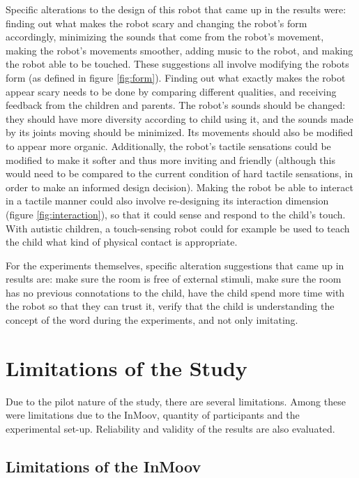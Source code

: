 Specific alterations to the design of this robot that came up in the results were: finding out what makes the robot scary and changing the robot's form accordingly, minimizing the sounds that come from the robot's movement, making the robot's movements smoother, adding music to the robot, and making the robot able to be touched. These suggestions all involve modifying the robots form (as defined in figure \ref{fig:form}). Finding out what exactly makes the robot appear scary needs to be done by comparing different qualities, and receiving feedback from the children and parents. The robot's sounds should be changed: they should have more diversity according to child using it, and the sounds made by its joints moving should be minimized. Its movements should also be modified to appear more organic. Additionally, the robot's tactile sensations could be modified to make it softer and thus more inviting and friendly (although this would need to be compared to the current condition of hard tactile sensations, in order to make an informed design decision). Making the robot be able to interact in a tactile manner could also involve re-designing its interaction dimension (figure \ref{fig:interaction}), so that it could sense and respond to the child's touch. With autistic children, a touch-sensing robot could for example be used to teach the child what kind of physical contact is appropriate.

For the experiments themselves, specific alteration suggestions that came up in results are: make sure the room is free of external stimuli, make sure the room has no previous connotations to the child, have the child spend more time with the robot so that they can trust it, verify that the child is understanding the concept of the word during the experiments, and not only imitating.



\section{Limitations of the Study}

Due to the pilot nature of the study, there are several limitations. Among these were limitations due to the InMoov, quantity of participants and the experimental set-up. Reliability and validity of the results are also evaluated.


\subsection{Limitations of the InMoov}

